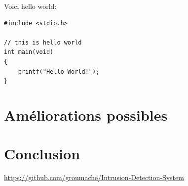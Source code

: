 \documentclass[a4paper]{article}
\begin{document}
Voici hello world:

\begin{lstlisting}[style=CStyle]
#include <stdio.h>

// this is hello world
int main(void)
{
    printf("Hello World!"); 
}
\end{lstlisting}










\section{Améliorations possibles}













\section{Conclusion}


















\newpage \tableofcontents \listoffigures
\begin{thebibliography}{9}
 {\small \url{https://github.com/groumache/Intrusion-Detection-System}}
\end{thebibliography}
\end{document}
